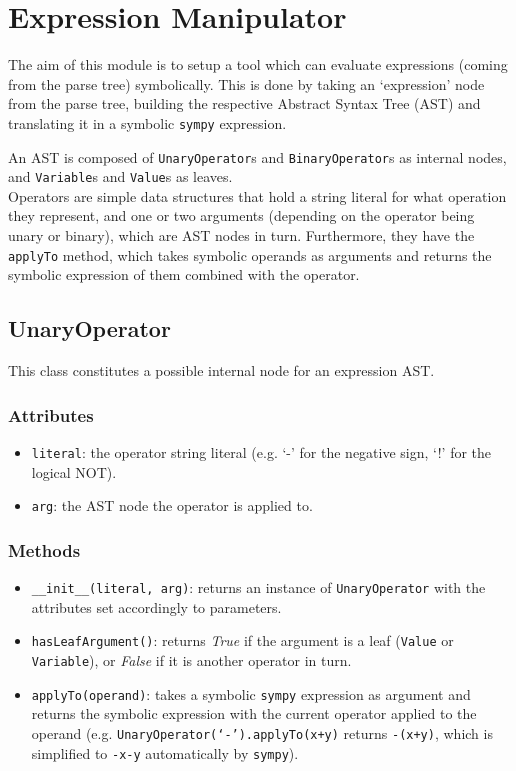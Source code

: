 \documentclass[12pt,a4paper]{report}
\theoremstyle{definition}
\theoremstyle{definition}
\theoremstyle{definition}
\begin{document}
\section{Expression Manipulator}
The aim of this module is to setup a tool which can evaluate expressions (coming from the parse tree) symbolically. This is done by taking an `expression' node from the parse tree, building the respective Abstract Syntax Tree (AST) and translating it in a symbolic \texttt{sympy} expression.

An AST is composed of \texttt{UnaryOperator}s and \texttt{BinaryOperator}s as internal nodes, and \texttt{Variable}s and \texttt{Value}s as leaves.\\
Operators are simple data structures that hold a string literal for what operation they represent, and one or two arguments (depending on the operator being unary or binary), which are AST nodes in turn. Furthermore, they have the \texttt{applyTo} method, which takes symbolic operands as arguments and returns the symbolic expression of them combined with the operator.
\subsection{UnaryOperator}
This class constitutes a possible internal node for an expression AST.
\subsubsection{Attributes}
\begin{itemize}
    \itemsep 0em
    \item \texttt{literal}: the operator string literal (e.g. `-' for the negative sign, `!' for the logical NOT).
    \item \texttt{arg}: the AST node the operator is applied to.
\end{itemize}
\subsubsection{Methods}
\begin{itemize}
    \itemsep 0em
    \item \texttt{\_\_init\_\_(literal, arg)}: returns an instance of \texttt{UnaryOperator} with the attributes set accordingly to parameters.
    \item \texttt{hasLeafArgument()}: returns \textit{True} if the argument is a leaf (\texttt{Value} or \texttt{Variable}), or \textit{False} if it is another operator in turn.
    \item \texttt{applyTo(operand)}: takes a symbolic \texttt{sympy} expression as argument and returns the symbolic expression with the current operator applied to the operand (e.g. \texttt{UnaryOperator(`-').applyTo(x+y)} returns \texttt{-(x+y)}, which is simplified to \texttt{-x-y} automatically by \texttt{sympy}).
\end{itemize}
\end{document}
